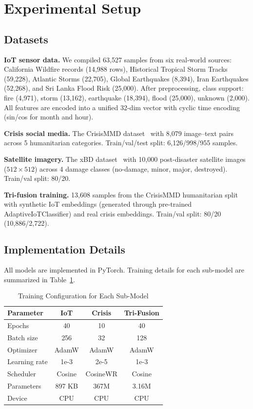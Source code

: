 \documentclass[journal]{IEEEtran}
\begin{document}
\section{Experimental Setup}

\subsection{Datasets}

\textbf{IoT sensor data.} We compiled 63,527 samples from six real-world sources: California Wildfire records (14,988 rows), Historical Tropical Storm Tracks (59,228), Atlantic Storms (22,705), Global Earthquakes (8,394), Iran Earthquakes (52,268), and Sri Lanka Flood Risk (25,000). After preprocessing, class support: fire (4,971), storm (13,162), earthquake (18,394), flood (25,000), unknown (2,000). All features are encoded into a unified 32-dim vector with cyclic time encoding (sin/cos for month and hour).

\textbf{Crisis social media.} The CrisisMMD dataset~\cite{alam2018crisismmd} with 8,079 image--text pairs across 5 humanitarian categories. Train/val/test split: 6,126/998/955 samples.

\textbf{Satellite imagery.} The xBD dataset~\cite{gupta2019xbd} with 10,000 post-disaster satellite images ($512 \times 512$) across 4 damage classes (no-damage, minor, major, destroyed). Train/val split: 80/20.

\textbf{Tri-fusion training.} 13,608 samples from the CrisisMMD humanitarian split with synthetic IoT embeddings (generated through pre-trained AdaptiveIoTClassifier) and real crisis embeddings. Train/val split: 80/20 (10,886/2,722).

\subsection{Implementation Details}

All models are implemented in PyTorch. Training details for each sub-model are summarized in Table~\ref{tab:training_config}.

\begin{table}[!t]
\centering
\caption{Training Configuration for Each Sub-Model}
\label{tab:training_config}
\begin{tabular}{lccc}
\toprule
\textbf{Parameter} & \textbf{IoT} & \textbf{Crisis} & \textbf{Tri-Fusion} \\
\midrule
Epochs & 40 & 10 & 40 \\
Batch size & 256 & 32 & 128 \\
Optimizer & AdamW & AdamW & AdamW \\
Learning rate & 1e-3 & 2e-5 & 1e-3 \\
Scheduler & Cosine & CosineWR & Cosine \\
Parameters & 897 KB & 367M & 3.16M \\
Device & CPU & CPU & CPU \\
\bottomrule
\end{tabular}
\end{table}
\end{document}
